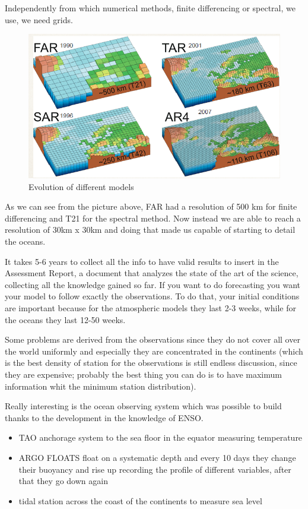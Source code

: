 Independently from which numerical methods, finite differencing or spectral, we use, we need grids. 
\begin{figure}[h!]
    \centering
    \includegraphics[width=0.5\linewidth]{uploads/Screenshot 2024-11-20 213227.png}
    \caption{Evolution of different models}
    \label{fig:enter-label}
\end{figure}
As we can see from the picture above, FAR had a resolution of 500 km for finite differencing and T21 for the spectral method. Now instead we are able to reach a resolution of 30km x 30km and doing that made us capable of starting to detail the oceans. 

It takes 5-6 years to collect all the info to have valid results to insert in the Assessment Report, a document that analyzes the state of the art of the science, collecting all the knowledge gained so far. 
If you want to do forecasting you want your model to follow exactly the observations. To do that, your initial conditions are important because for the atmospheric models they last 2-3 weeks, while for the oceans they last 12-50 weeks. 

Some problems are derived from the observations since they do not cover all over the world uniformly and especially they are concentrated in the continents (which is the best density of station for the observations is still endless discussion, since they are expensive; probably the best thing you can do is to have maximum information whit the minimum station distribution). 

Really interesting is the ocean observing system which was possible to build thanks to the development in the knowledge of ENSO. 
\begin{itemize}
    \item TAO anchorage system to the sea floor in the equator measuring temperature
    \item  ARGO FLOATS float on a systematic depth and every 10 days they change their buoyancy and rise up recording the profile of different variables, after that they go down again 
    \item tidal station across the coast of the continents to measure sea level 
\end{itemize}

